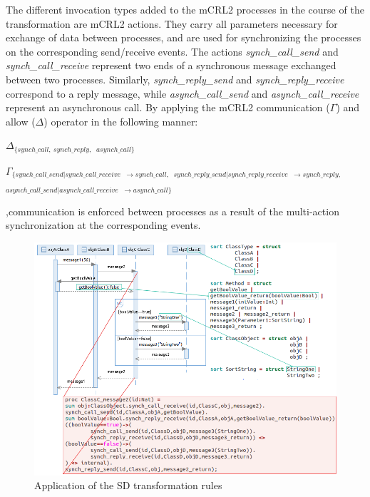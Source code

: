 \documentclass[letter]{llncs}
\newcommand{\figshrink}{\vspace{-.6cm}}
\newcommand{\figshrinkend}{}
\begin{document}
The different invocation types added to the mCRL2 processes in the course of the transformation are mCRL2 actions.
They carry all parameters necessary for exchange of data between processes, and are used for synchronizing the processes
on the corresponding send/receive events. The actions \emph{synch\_call\_send} and \emph{synch\_call\_receive} represent
two ends of a synchronous message exchanged between two processes. Similarly, \emph{synch\_reply\_send} 
and \emph{synch\_reply\_receive} correspond to a reply message, while \emph{asynch\_call\_send} and \emph{asynch\_call\_receive} 
represent an asynchronous call. By applying the mCRL2 communication ($\Gamma$) and allow ($\Delta$) operator in the following manner:
 \vspace{-10 pt}
\begin{center}
$ \Delta_{\{synch\_call,\ synch\_reply, } $
  $    _{asynch\_call\}} $
  
$ \Gamma_{\{synch\_call\_send|
   synch\_call\_receive} $
  $  _{\rightarrow synch\_call, } $
  $ _{synch\_reply\_send|synch\_reply\_receive} $
  $  _{\rightarrow synch\_reply,} $
 $ _{asynch\_call\_send|asynch\_call\_receive} $
  $  _{\rightarrow asynch\_call\}} $
\end{center}
,communication is enforced between processes as a result of the multi-action synchronization at the corresponding events. 

\begin{figure}[t!]
\centering
\figshrink
\includegraphics[width=1.0\linewidth]{./yea1.png}
\caption{Application of the SD transformation rules}
\label{fig:application1}
\figshrinkend
\end{figure}
\end{document}
